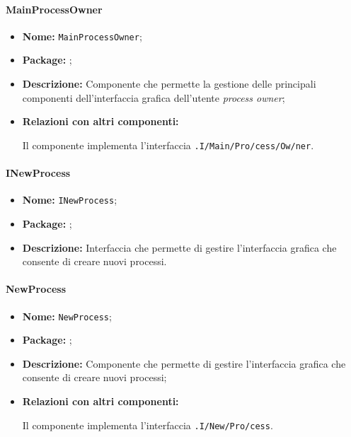 \paragraph{MainProcessOwner}
\begin{flushleft}
\begin{itemize}
\item \textbf{Nome:} \texttt{MainProcessOwner};
\item \textbf{Package:} \texttt{\viewAdmin{}};
\item \textbf{Descrizione:} Componente che permette la gestione delle principali componenti dell'interfaccia grafica dell'utente \textit{process owner};
\item \textbf{Relazioni con altri componenti:}
\begin{sloppypar}
Il componente implementa l'interfaccia \texttt{\viewAdmin{}.I\fshyp{}Main\fshyp{}Pro\fshyp{}cess\fshyp{}Ow\fshyp{}ner}.
\end{sloppypar}
\end{itemize}
\end{flushleft}

\paragraph{INewProcess}
\begin{itemize}
\item \textbf{Nome:} \texttt{INewProcess};
\item \textbf{Package:} \texttt{\viewAdmin{}};
\item \textbf{Descrizione:} Interfaccia che permette di gestire l'interfaccia grafica che consente di creare nuovi processi.
\end{itemize}

\paragraph{NewProcess}
\begin{flushleft}
\begin{itemize}
\item \textbf{Nome:} \texttt{NewProcess};
\item \textbf{Package:} \texttt{\viewAdmin{}};
\item \textbf{Descrizione:} Componente che permette di gestire l'interfaccia grafica che consente di creare nuovi processi;
\item \textbf{Relazioni con altri componenti:}
\begin{sloppypar}
Il componente implementa l'interfaccia \texttt{\viewAdmin{}.I\fshyp{}New\fshyp{}Pro\fshyp{}cess}.
\end{sloppypar}
\end{itemize}
\end{flushleft}


